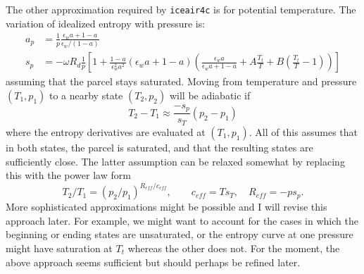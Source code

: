 \documentclass{article}
\newcommand{\epsw}{\epsilon_w}
\begin{document}
The other approximation required by \texttt{iceair4c} is for potential temperature. The variation of idealized entropy with pressure is:
\begin{align*}
    a_p &= \frac{1}{p} \frac{\epsw a + 1-a}{\epsw/(1-a)} \\
    s_p &= -\omega R_d \frac{1}{p} \left[ 1 + \frac{1-a}{\epsw^2 a^2} (\epsw a + 1-a) \left( \frac{\epsw a}{\epsw a + 1-a} + A \frac{T_t}{T} + B \left( \frac{T_t}{T} - 1 \right) \right) \right]
\end{align*}
assuming that the parcel stays saturated. Moving from temperature and pressure $(T_1,p_1)$ to a nearby state $(T_2,p_2)$ will be adiabatic if
\begin{equation*}
    T_2-T_1 \approx \frac{-s_p}{s_T} (p_2-p_1)
\end{equation*}
where the entropy derivatives are evaluated at $(T_1,p_1)$. All of this assumes that in both states, the parcel is saturated, and that the resulting states are sufficiently close. The latter assumption can be relaxed somewhat by replacing this with the power law form
\begin{equation*}
    T_2/T_1 = (p_2/p_1)^{R_{eff}/c_{eff}}, \qquad c_{eff} = T s_T, \quad R_{eff} = -p s_p.
\end{equation*}
More sophisticated approximations might be possible and I will revise this approach later. For example, we might want to account for the cases in which the beginning or ending states are unsaturated, or the entropy curve at one pressure might have saturation at $T_t$ whereas the other does not. For the moment, the above approach seems sufficient but should perhaps be refined later.


        
\end{document}
